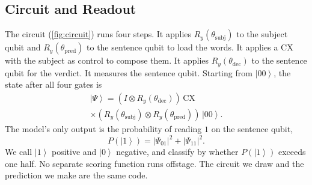 \documentclass{article}
\newcommand{\ket}[1]{\left|#1\right\rangle}
\begin{document}
\subsection{Circuit and Readout}

The circuit (\cref{fig:circuit}) runs four steps. It applies
$R_y(\theta_\mathrm{subj})$ to the subject qubit and $R_y(\theta_\mathrm{pred})$
to the sentence qubit to load the words. It applies a CX with the subject as
control to compose them. It applies $R_y(\theta_\mathrm{dec})$ to the sentence
qubit for the verdict. It measures the sentence qubit. Starting from $\ket{00}$,
the state after all four gates is
\begin{multline}
  \ket{\Psi} =
  (I\otimes R_y(\theta_\mathrm{dec}))\,\mathrm{CX} \\
  \times (R_y(\theta_\mathrm{subj})\otimes R_y(\theta_\mathrm{pred}))\,
  \ket{00}.
  \label{eq:forward}
\end{multline}
The model's only output is the probability of reading $1$ on the sentence qubit,
\begin{equation}
  P(\ket{1}) = |\Psi_{01}|^2 + |\Psi_{11}|^2.
  \label{eq:readout}
\end{equation}
We call $\ket{1}$ positive and $\ket{0}$ negative, and classify by whether
$P(\ket{1})$ exceeds one half. No separate scoring function runs offstage. The
circuit we draw and the prediction we make are the same code.
\end{document}
